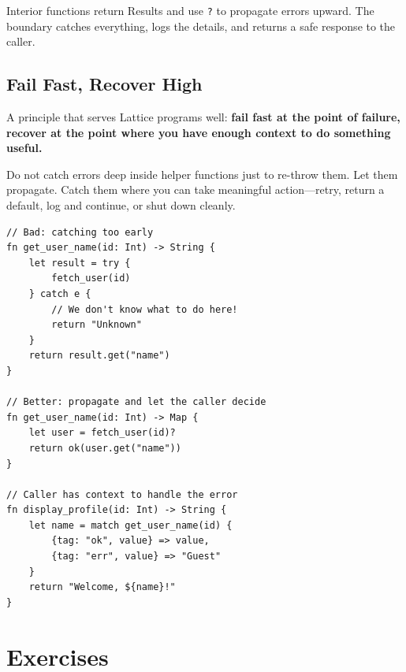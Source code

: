 Interior functions return Results and use \lstinline|?| to propagate errors upward. The boundary catches everything, logs the details, and returns a safe response to the caller.

\subsection{Fail Fast, Recover High}\label{sec:fail-fast}

A principle that serves Lattice programs well: \textbf{fail fast at the point of failure, recover at the point where you have enough context to do something useful.}

Do not catch errors deep inside helper functions just to re-throw them. Let them propagate. Catch them where you can take meaningful action---retry, return a default, log and continue, or shut down cleanly.

\begin{lstlisting}[language=Lattice, caption={Let errors propagate to where context exists}]
// Bad: catching too early
fn get_user_name(id: Int) -> String {
    let result = try {
        fetch_user(id)
    } catch e {
        // We don't know what to do here!
        return "Unknown"
    }
    return result.get("name")
}

// Better: propagate and let the caller decide
fn get_user_name(id: Int) -> Map {
    let user = fetch_user(id)?
    return ok(user.get("name"))
}

// Caller has context to handle the error
fn display_profile(id: Int) -> String {
    let name = match get_user_name(id) {
        {tag: "ok", value} => value,
        {tag: "err", value} => "Guest"
    }
    return "Welcome, ${name}!"
}
\end{lstlisting}

\section{Exercises}\label{sec:error-handling-exercises}

